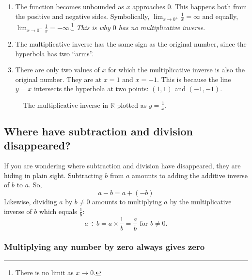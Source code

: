 \documentclass[
  a4paper,
]{article}
\begin{document}
\begin{enumerate}
\def\labelenumi{\alph{enumi}.}
\item
  The function becomes unbounded as \(x\) approaches \(0\). This happens
  both from the positive and negative sides. Symbolically,
  \(\lim_{x \to 0^{+}}\frac{1}{x}=\infty\) and equally,
  \(\lim_{x \to 0^{-}}\frac{1}{x}=-\infty\).\footnote{There is no limit
    as \(x \to 0\).} \emph{This is why \(0\) has no multiplicative
  inverse}.
\item
  The multiplicative inverse has the same sign as the original number,
  since the hyperbola has two ``arms''.
\item
  There are only two values of \(x\) for which the multiplicative
  inverse is also the original number. They are at \(x = 1\) and
  \(x = -1\). This is because the line \(y = x\) intersects the
  hyperbola at two points: \((1, 1)\) and \((-1, -1)\).
\end{enumerate}

\begin{figure}
\hypertarget{fig:hyperbola}{%
\centering

\caption{The multiplicative inverse in \(\mathbb{R}\) plotted as
\(y = \frac{1}{x}\).}\label{fig:hyperbola}
}
\end{figure}

\hypertarget{where-have-subtraction-and-division-disappeared}{%
\subsection{Where have subtraction and division
disappeared?}\label{where-have-subtraction-and-division-disappeared}}

If you are wondering where subtraction and division have disappeared,
they are hiding in plain sight. Subtracting \(b\) from \(a\) amounts to
adding the additive inverse of \(b\) to \(a\). So, \[
a - b = a + (-b)
\] Likewise, dividing \(a\) by \(b \ne 0\) amounts to multiplying \(a\)
by the multiplicative inverse of \(b\) which equals \(\frac{1}{b}\): \[
a \div b = a \times \frac{1}{b} = \frac{a}{b} \mbox{ for } b \ne 0.
\]

\hypertarget{multiplying-any-number-by-zero-always-gives-zero}{%
\subsubsection{Multiplying any number by zero always gives
zero}\label{multiplying-any-number-by-zero-always-gives-zero}}
\end{document}
